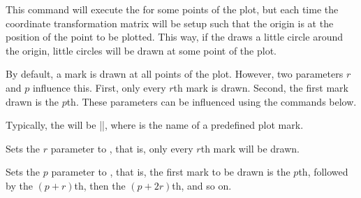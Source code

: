 \begin{command}{\pgfplothandlermark{}}
  This command will execute the  for some points of the
  plot, but each time the coordinate transformation matrix will be
  setup such that the origin is at the position of the point to be
  plotted. This way, if the  draws a little circle
  around the origin, little circles will be drawn at some point of the
  plot.

  By default, a mark is drawn at all points of the plot. However, two
  parameters $r$ and $p$ influence this. First, only every $r$th mark
  is drawn. Second, the first mark drawn is the $p$th. These
  parameters can be influenced using the commands below.
  
\begin{codeexample}[]
\end{codeexample}

  Typically, the  will be ||, where  is the name of a
  predefined plot mark.
\end{command}

\begin{command}{\pgfsetplotmarkrepeat{}}
  Sets the $r$ parameter to , that is, only every $r$th
  mark will be drawn.
\end{command}

\begin{command}{\pgfsetplotmarkphase{}}
  Sets the $p$ parameter to , that is, the first mark to
  be drawn is the $p$th, followed by the $(p+r)$th, then the
  $(p+2r)$th, and so on.
\end{command}

